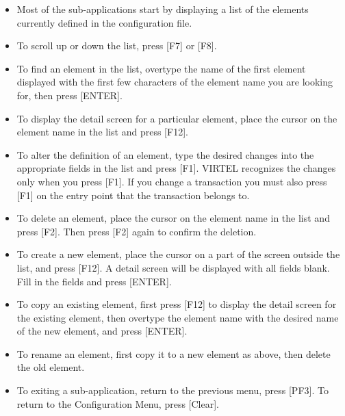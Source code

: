 \documentclass[letterpaper,10pt,english]{sphinxmanual}
\begin{document}
\begin{itemize}
\item {} 
Most of the sub-applications start by displaying a list of the elements currently defined in the configuration file.

\item {} 
To scroll up or down the list, press {[}F7{]} or {[}F8{]}.

\item {} 
To find an element in the list, overtype the name of the first element displayed with the first few characters of the element name you are looking for, then press {[}ENTER{]}.

\item {} 
To display the detail screen for a particular element, place the cursor on the element name in the list and press {[}F12{]}.

\item {} 
To alter the definition of an element, type the desired changes into the appropriate fields in the list and press {[}F1{]}. VIRTEL recognizes the changes only when you press {[}F1{]}. If you change a transaction you must also press {[}F1{]} on the entry point that the transaction belongs to.

\item {} 
To delete an element, place the cursor on the element name in the list and press {[}F2{]}. Then press {[}F2{]} again to confirm the deletion.

\item {} 
To create a new element, place the cursor on a part of the screen outside the list, and press {[}F12{]}. A detail screen will be displayed with all fields blank. Fill in the fields and press {[}ENTER{]}.

\item {} 
To copy an existing element, first press {[}F12{]} to display the detail screen for the existing element, then overtype the element name with the desired name of the new element, and press {[}ENTER{]}.

\item {} 
To rename an element, first copy it to a new element as above, then delete the old element.

\item {} 
To exiting a sub-application, return to the previous menu, press {[}PF3{]}. To return to the Configuration Menu, press {[}Clear{]}.

\end{itemize}
\end{document}
